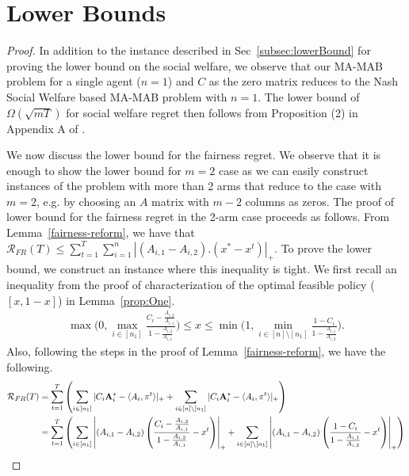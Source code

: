 \section{Lower Bounds}
\lowerRegret*
\begin{proof}
In addition to the instance described in Sec~\ref{subsec:lowerBound} for proving the lower bound on the social welfare, we observe that our MA-MAB problem for a single agent ($n=1$) and $C$ as the zero matrix reduces to the Nash Social Welfare based MA-MAB problem \cite{Hossain2020FairAF} with $n=1$. The lower bound of $\Omega(\sqrt{mT})$ for social welfare regret then follows from Proposition (2) in Appendix A of \citep{Hossain2020FairAF}.

    We now discuss the lower bound for the fairness regret. We observe that it is enough to show the lower bound for $m=2$ case as we can easily construct instances of the problem with more than 2 arms that reduce to the case with $m=2$, e.g. by choosing an $A$ matrix with $m-2$ columns as zeros. The proof of lower bound for the fairness regret in the 2-arm case proceeds as follows. From Lemma~\ref{fairness-reform}, we have that $\mathcal{R}_{FR}(T) \leq \sum_{t=1}^T\sum_{i=1}^n \left|(A_{i,1}-A_{i,2}).(x^*-x^t)\right|_+$. To prove the lower bound, we construct an instance where this inequality is tight. We first recall an inequality from the proof of characterization of the optimal feasible policy ($[x, 1-x]$) in Lemma~\ref{prop:One}.
    \begin{align}\label{charac-for-lb}
    \max \Bigg( 0,  \max_{i \in [n_1]}\frac{C_i - \frac{A_{i,2}}{A_{i,1}}}{ 1 - \frac{A_{i,2}}{A_{i,1}}} \Bigg) \leq x \leq \min \Bigg( 1,  \min_{i \in [n] \setminus [n_1]}\frac{1 - C_i}{ 1 - \frac{A_{i,1}}{A_{i,2}}} \Bigg). 
    \end{align}
    Also, following the steps in the proof of Lemma~\ref{fairness-reform}, we have the following.
    \begin{align}\label{FR-lb}
        \mathcal{R}_{FR}(T) &= \sum_{t=1}^T\left( \sum_{i\in [n_1]}|C_i\mathbf{A}^{\star}_i - \langle A_i, \pi^t \rangle|_+ + \sum_{i\in [n]\setminus [n_1]}|C_i\mathbf{A}^{\star}_i - \langle A_i, \pi^t \rangle|_+\right) \nonumber \\
        &= \sum_{t=1}^T\left(\sum_{i\in [n_1]}
        \left| (A_{i, 1}-A_{i, 2})\left(\frac{C_i-\frac{A_{i, 2}}{A_{i, 1}}}{1-\frac{A_{i, 2}}{A_{i, 1}}}-x^t \right)\right|_+
        +
        \sum_{i\in [n]\setminus [n_1]} \left|(A_{i, 1}-A_{i, 2})\left( \frac{1-C_i}{1-\frac{A_{i, 1}}{A_{i, 2}}} - x^t \right)\right|_+ \right)
    \end{align}

\end{proof}
